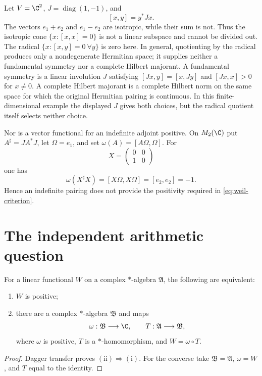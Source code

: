 Let $V=\C^2$, $J=\operatorname{diag}(1,-1)$, and
\[
 [x,y]=y^*Jx.
\]
The vectors $e_1+e_2$ and $e_1-e_2$ are isotropic, while their sum is
not.  Thus the isotropic cone $\{x:[x,x]=0\}$ is not a linear subspace
and cannot be divided out.  The radical
$\{x:[x,y]=0\ \forall y\}$ is zero here.  In general, quotienting by the
radical produces only a nondegenerate Hermitian space; it supplies
neither a fundamental symmetry nor a complete Hilbert majorant.
A fundamental symmetry is a linear involution $J$ satisfying
$[Jx,y]=[x,Jy]$ and $[Jx,x]>0$ for $x\ne0$.
A complete Hilbert majorant is a complete Hilbert norm on the same space
for which the original Hermitian pairing is continuous.
In this finite-dimensional example the displayed $J$ gives both choices,
but the radical quotient itself selects neither choice.

Nor is a vector functional for an indefinite adjoint positive.  On
$M_2(\C)$ put $A^\sharp=JA^*J$, let $\Omega=e_1$, and set
$\omega(A)=[A\Omega,\Omega]$.  For
\[
 X=\begin{pmatrix}0&0\\1&0\end{pmatrix}
\]
one has
\begin{equation}
 \omega(X^\sharp X)=[X\Omega,X\Omega]=[e_2,e_2]=-1.
 \label{eq:indefinite-negative}
\end{equation}
Hence an indefinite pairing does not provide the positivity required in
\eqref{eq:weil-criterion}.

\section{The independent arithmetic question}

\begin{proposition}
For a linear functional $W$ on a complex $*$-algebra $\mathfrak A$, the
following are equivalent:
\begin{enumerate}
\item $W$ is positive;
\item there are a complex $*$-algebra $\mathfrak B$ and maps
\[
 \omega:\mathfrak B\longrightarrow\C,
 \qquad T:\mathfrak A\longrightarrow\mathfrak B,
\]
where $\omega$ is positive, $T$ is a $*$-homomorphism, and
$W=\omega\circ T$.
\end{enumerate}
\end{proposition}

\begin{proof}
Dagger transfer proves $(\mathrm{ii})\Rightarrow(\mathrm{i})$.  For the converse take
$\mathfrak B=\mathfrak A$, $\omega=W$, and $T$ equal to the identity.
\end{proof}


